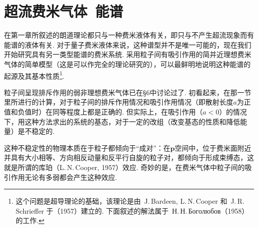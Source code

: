 \section{超流费米气体\ 能谱}

在第一章所叙述的朗道理论都只与一种费米液体有关，即只与不产生超流现象而有能谱的液体有关. 对于量子费米液体来说，这种谱型并不是唯一可能的，现在我们开始研究具有另一类型能谱的费米系统. 采用粒子间有吸引作用的简并近理想费米气体的简单模型（这是可以作完全的理论研究的），可以最鲜明地说明这种能谱的起源及其基本性质\footnote{这个问题是超导理论的基础，该理论是由~J.\,Bardeen, L.\,N.\,Cooper 和~J.\,R.\,Schrieffer 于（1957）建立的. 下面叙述的解法属于~Н.\,Н.\,Боголюбов（1958）的工作.}.

粒子间呈现排斥作用的弱非理想费米气体已在§6中讨论过了. 初看起来，在那一节里所进行的计算，对于粒子间的排斥作用情况和吸引作用情况（即散射长度$a$为正值和负值时）在同等程度上都是正确的. 但实际上，在吸引作用（$a<0$）的情况下，用这种方法求出的系统的基态，对于一定的改组（改变基态的性质和降低能量）是不稳定的.

这种不稳定性的物理本质在于粒子都倾向于“成对”：在$\bm p$空间中，位于费米面附近并具有大小相等、方向相反动量和反平行自旋的粒子对，都倾向于形成束缚态，这就是所谓的库珀（L.\,N.\,Cooper, 1957）效应. 奇妙的是，在费米气体中粒子间的吸引作用无论有多弱都会产生这种效应.

